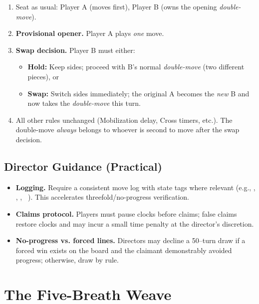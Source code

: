 \documentclass[11pt]{article}
\newcommand{\CC}[1]{\textcolor{blue!60!black}{\scriptsize\ttfamily[CF:#1]}}
\newcommand{\SC}[1]{\textcolor{red!60!black}{\scriptsize\ttfamily[S:#1]}}
\newcommand{\RoC}{\textcolor{teal!60!black}{\scriptsize\ttfamily[Rooted]}}
\newcommand{\RC}{\textcolor{purple!70!black}{\scriptsize\ttfamily[RC]}}
\renewcommand{\RC}[1][]{%
  \textcolor{purple!70!black}{\scriptsize\ttfamily[RC%
  \if\relax\detokenize{#1}\relax\else~#1\fi]}}
\begin{document}
\begin{rulevariant}[title={Pie Rule (Tournament Variant)}]
\begin{enumerate}\itemsep0.25em
  \item Seat as usual: Player A (moves first), Player B (owns the opening \emph{double-move}).
  \item \textbf{Provisional opener.} Player A plays \emph{one} move.
  \item \textbf{Swap decision.} Player B must either:
  \begin{itemize}\itemsep=0.2em
    \item \textbf{Hold:} Keep sides; proceed with B’s normal \emph{double-move} (two different pieces), or
    \item \textbf{Swap:} Switch sides immediately; the original A becomes the \emph{new} B and now takes the \emph{double-move} this turn.
  \end{itemize}
  \item All other rules unchanged (Mobilization delay, Cross timers, etc.). The double-move \emph{always} belongs to whoever is second to move after the swap decision.
\end{enumerate}
\end{rulevariant}

\medskip
\subsection{Director Guidance (Practical)}

\begin{itemize}[leftmargin=1.3em,itemsep=0.2em]
  \item \textbf{Logging.} Require a consistent move log with state tags where relevant (e.g., \texttt{\RoC}, \texttt{\CC{in 1/3}}, \texttt{\SC{H}}, \texttt{\RC[3/5]}). This accelerates threefold/no-progress verification.
  \item \textbf{Claims protocol.} Players must pause clocks before claims; false claims restore clocks and may incur a small time penalty at the director’s discretion.
  \item \textbf{No-progress vs. forced lines.} Directors may decline a 50–turn draw if a forced win exists on the board and the claimant demonstrably avoided progress; otherwise, draw by rule.
\end{itemize}

\clearpage
\section{The Five-Breath Weave}
\label{sec:five-breath-weave}
\end{document}
